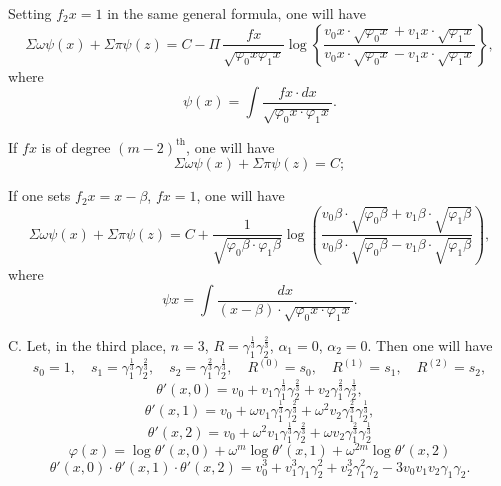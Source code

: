 \documentclass{article}
\begin{document}
Setting $f_2 x = 1$ in the same general formula, one will have
\[ \Sigma\omega\psi(x)+\Sigma\pi\psi(z) = C-\Pi\,\frac{f x}{\sqrt{\varphi_0 x\varphi_1 x}}\log\left\{\frac{v_0 x \cdot \sqrt{\varphi_0 x}+v_1 x \cdot \sqrt{\varphi_1 x}}{v_0 x \cdot \sqrt{\varphi_0 x}-v_1 x \cdot \sqrt{\varphi_1 x}}\right\}, \]
where
\[ \psi(x) = \int \frac{f x \cdot dx}{\sqrt{\varphi_0 x \cdot \varphi_1 x}}. \]

If $f x$ is of degree $(m-2)^{\text{th}}$, one will have
\[ \Sigma\omega\psi(x)+\Sigma\pi\psi(z) = C; \]

If one sets $f_2 x = x-\beta$, $f x = 1$, one will have
\[ \Sigma\omega\psi(x)+\Sigma\pi\psi(z) = C+\frac{1}{\sqrt{\varphi_0\beta \cdot \varphi_1\beta}}\log\left(\frac{v_0\beta \cdot \sqrt{\varphi_0\beta}+v_1\beta \cdot \sqrt{\varphi_1\beta}}{v_0\beta \cdot \sqrt{\varphi_0\beta}-v_1\beta \cdot \sqrt{\varphi_1\beta}}\right), \]
where
\[ \psi x = \int \frac{dx}{(x-\beta) \cdot \sqrt{\varphi_0 x \cdot \varphi_1 x}}. \]

C. Let, in the third place, $n = 3$, $R = \gamma_1^{\frac{1}{3}}\gamma_2^{\frac{2}{3}}$, $\alpha_1 = 0$, $\alpha_2 = 0$.
Then one will have
\[ s_0 = 1, \quad s_1 = \gamma_1^{\frac{1}{3}}\gamma_2^{\frac{2}{3}}, \quad s_2 = \gamma_1^{\frac{2}{3}}\gamma_2^{\frac{1}{3}}, \quad R^{(0)} = s_0, \quad R^{(1)} = s_1, \quad R^{(2)} = s_2, \]
\[ \theta'(x,0) = v_0+v_1\gamma_1^{\frac{1}{3}}\gamma_2^{\frac{2}{3}}+v_2\gamma_1^{\frac{2}{3}}\gamma_2^{\frac{1}{3}}, \]
\[ \theta'(x,1) = v_0+\omega v_1\gamma_1^{\frac{1}{3}}\gamma_2^{\frac{2}{3}}+\omega^{2}v_2\gamma_1^{\frac{2}{3}}\gamma_2^{\frac{1}{3}}, \]
\[ \theta'(x,2) = v_0+\omega^{2}v_1\gamma_1^{\frac{1}{3}}\gamma_2^{\frac{2}{3}}+\omega v_2\gamma_1^{\frac{2}{3}}\gamma_2^{\frac{1}{3}} \]
\[ \varphi(x) = \log\theta'(x,0)+\omega^{m}\log\theta'(x,1)+\omega^{2m}\log\theta'(x,2) \]
\[ \theta'(x,0) \cdot \theta'(x,1) \cdot \theta'(x,2) = v_0^{3}+v_1^{3}\gamma_1\gamma_2^{2}+v_2^{3}\gamma_1^{2}\gamma_2-3v_0 v_1 v_2\gamma_1\gamma_2. \]
\end{document}
